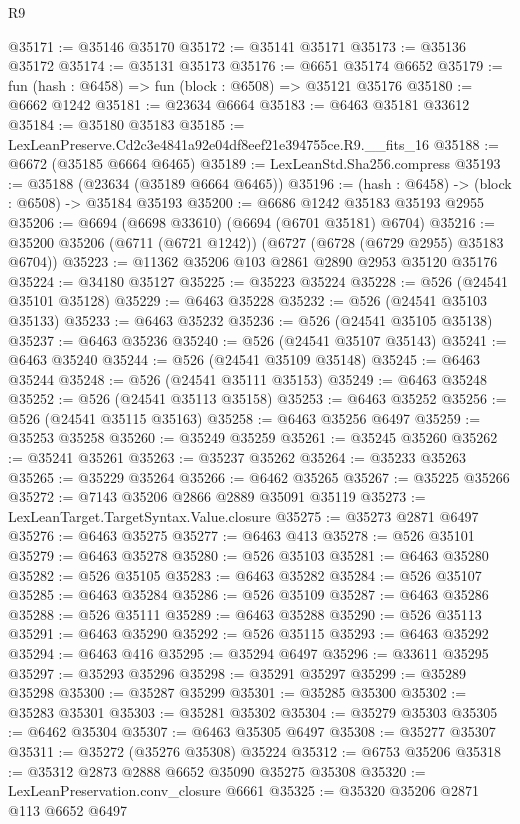 \begin{lexlean}{R9}
\begin{coremodule}
@35171 := @35146 @35170
@35172 := @35141 @35171
@35173 := @35136 @35172
@35174 := @35131 @35173
@35176 := @6651 @35174 @6652
@35179 := fun (hash : @6458) => fun (block : @6508) => @35121 @35176
@35180 := @6662 @1242
@35181 := @23634 @6664
@35183 := @6463 @35181 @33612
@35184 := @35180 @35183
@35185 := LexLeanPreserve.Cd2c3e4841a92e04df8eef21e394755ce.R9.__fits_16
@35188 := @6672 (@35185 @6664 @6465)
@35189 := LexLeanStd.Sha256.compress
@35193 := @35188 (@23634 (@35189 @6664 @6465))
@35196 := (hash : @6458) -> (block : @6508) -> @35184 @35193
@35200 := @6686 @1242 @35183 @35193 @2955
@35206 := @6694 (@6698 @33610) (@6694 (@6701 @35181) @6704)
@35216 := @35200 @35206 (@6711 (@6721 @1242)) (@6727 (@6728 (@6729 @2955) @35183 @6704))
@35223 := @11362 @35206 @103 @2861 @2890 @2953 @35120 @35176
@35224 := @34180 @35127
@35225 := @35223 @35224
@35228 := @526 (@24541 @35101 @35128)
@35229 := @6463 @35228
@35232 := @526 (@24541 @35103 @35133)
@35233 := @6463 @35232
@35236 := @526 (@24541 @35105 @35138)
@35237 := @6463 @35236
@35240 := @526 (@24541 @35107 @35143)
@35241 := @6463 @35240
@35244 := @526 (@24541 @35109 @35148)
@35245 := @6463 @35244
@35248 := @526 (@24541 @35111 @35153)
@35249 := @6463 @35248
@35252 := @526 (@24541 @35113 @35158)
@35253 := @6463 @35252
@35256 := @526 (@24541 @35115 @35163)
@35258 := @6463 @35256 @6497
@35259 := @35253 @35258
@35260 := @35249 @35259
@35261 := @35245 @35260
@35262 := @35241 @35261
@35263 := @35237 @35262
@35264 := @35233 @35263
@35265 := @35229 @35264
@35266 := @6462 @35265
@35267 := @35225 @35266
@35272 := @7143 @35206 @2866 @2889 @35091 @35119
@35273 := LexLeanTarget.TargetSyntax.Value.closure
@35275 := @35273 @2871 @6497
@35276 := @6463 @35275
@35277 := @6463 @413
@35278 := @526 @35101
@35279 := @6463 @35278
@35280 := @526 @35103
@35281 := @6463 @35280
@35282 := @526 @35105
@35283 := @6463 @35282
@35284 := @526 @35107
@35285 := @6463 @35284
@35286 := @526 @35109
@35287 := @6463 @35286
@35288 := @526 @35111
@35289 := @6463 @35288
@35290 := @526 @35113
@35291 := @6463 @35290
@35292 := @526 @35115
@35293 := @6463 @35292
@35294 := @6463 @416
@35295 := @35294 @6497
@35296 := @33611 @35295
@35297 := @35293 @35296
@35298 := @35291 @35297
@35299 := @35289 @35298
@35300 := @35287 @35299
@35301 := @35285 @35300
@35302 := @35283 @35301
@35303 := @35281 @35302
@35304 := @35279 @35303
@35305 := @6462 @35304
@35307 := @6463 @35305 @6497
@35308 := @35277 @35307
@35311 := @35272 (@35276 @35308) @35224
@35312 := @6753 @35206
@35318 := @35312 @2873 @2888 @6652 @35090 @35275 @35308
@35320 := LexLeanPreservation.conv_closure @6661
@35325 := @35320 @35206 @2871 @113 @6652 @6497

\end{coremodule}
\end{lexlean}
